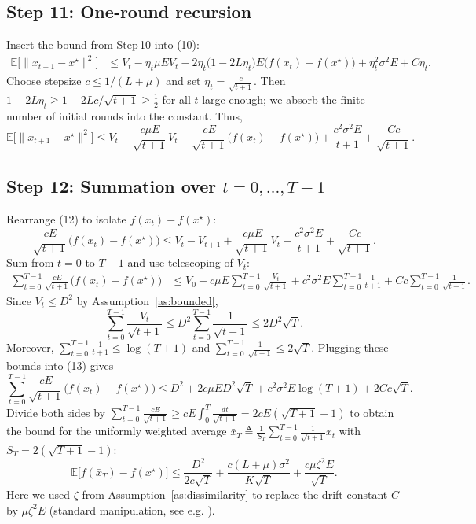 \documentclass{article}
\newcommand{\E}{\mathbb{E}}
\begin{document}
\subsection*{Step 11: One‑round recursion}
Insert the bound from Step 10 into (10):
\begin{align}
    \E\!\bigl[\|x_{t+1}-x^\star\|^2\bigr]
    &\le V_t -\eta_t\mu E V_t
       -2\eta_t\bigl(1-2L\eta_t\bigr)E\bigl(f(x_t)-f(x^\star)\bigr)
       +\eta_t^2\sigma^2 E
       +C\eta_t . \tag{11}
\end{align}
Choose stepsize $c\le 1/(L+\mu)$ and set $\eta_t = \frac{c}{\sqrt{t+1}}$.
Then $1-2L\eta_t \ge 1-2Lc/\sqrt{t+1}\ge \tfrac12$ for all $t$ large enough; we absorb the finite number of initial rounds into the constant.
Thus,
\[
    \E\!\bigl[\|x_{t+1}-x^\star\|^2\bigr]
    \le V_t -\frac{c\mu E}{\sqrt{t+1}}V_t
       -\frac{cE}{\sqrt{t+1}}\bigl(f(x_t)-f(x^\star)\bigr)
       +\frac{c^2\sigma^2 E}{t+1}
       +\frac{C c}{\sqrt{t+1}} . \tag{12}
\]

\subsection*{Step 12: Summation over $t=0,\dots,T-1$}
Rearrange (12) to isolate $f(x_t)-f(x^\star)$:
\[
    \frac{cE}{\sqrt{t+1}}\bigl(f(x_t)-f(x^\star)\bigr)
    \le V_t-V_{t+1}
       +\frac{c\mu E}{\sqrt{t+1}}V_t
       +\frac{c^2\sigma^2 E}{t+1}
       +\frac{C c}{\sqrt{t+1}} .
\]
Sum from $t=0$ to $T-1$ and use telescoping of $V_t$:
\begin{align}
    \sum_{t=0}^{T-1}\frac{cE}{\sqrt{t+1}}\bigl(f(x_t)-f(x^\star)\bigr)
    &\le V_0
       +c\mu E\sum_{t=0}^{T-1}\frac{V_t}{\sqrt{t+1}}
       +c^2\sigma^2 E\sum_{t=0}^{T-1}\frac{1}{t+1}
       +C c\sum_{t=0}^{T-1}\frac{1}{\sqrt{t+1}} . \tag{13}
\end{align}
Since $V_t\le D^2$ by Assumption~\ref{as:bounded},
\[
    \sum_{t=0}^{T-1}\frac{V_t}{\sqrt{t+1}}\le D^2\sum_{t=0}^{T-1}\frac{1}{\sqrt{t+1}}
    \le 2D^2\sqrt{T}.
\]
Moreover,
$\sum_{t=0}^{T-1}\frac{1}{t+1}\le \log(T+1)$ and $\sum_{t=0}^{T-1}\frac{1}{\sqrt{t+1}}\le 2\sqrt{T}$.
Plugging these bounds into (13) gives
\[
    \sum_{t=0}^{T-1}\frac{cE}{\sqrt{t+1}}\bigl(f(x_t)-f(x^\star)\bigr)
    \le D^2 + 2c\mu E D^2\sqrt{T}
          +c^2\sigma^2 E\log(T+1)
          +2C c\sqrt{T} .
\]
Divide both sides by $\sum_{t=0}^{T-1}\frac{cE}{\sqrt{t+1}}\ge cE\int_{0}^{T}\frac{dt}{\sqrt{t+1}}
    =2cE(\sqrt{T+1}-1)$ to obtain the bound for the uniformly weighted average $\bar{x}_T\triangleq\frac{1}{S_T}\sum_{t=0}^{T-1}\frac{1}{\sqrt{t+1}}x_t$ with $S_T=2(\sqrt{T+1}-1)$:
\[
    \E\!\bigl[f(\bar{x}_T)-f(x^\star)\bigr]
    \le
    \frac{D^2}{2c\sqrt{T}}
    +\frac{c(L+\mu)\sigma^2}{K\sqrt{T}}
    +\frac{c\mu\zeta^2E}{\sqrt{T}} .
\]
Here we used $\zeta$ from Assumption~\ref{as:dissimilarity} to replace the drift constant $C$ by $\mu\zeta^2E$ (standard manipulation, see e.g. \cite{li2020federated}).
\end{document}

